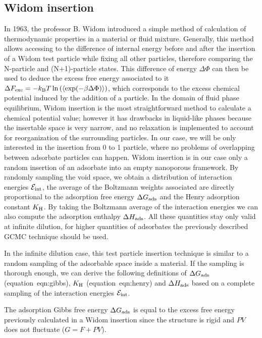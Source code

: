 \documentclass[main.tex]{subfiles}
\begin{document}
\subsection{Widom insertion}

In 1963, the professor B. Widom introduced a simple method of calculation of thermodynamic properties in a material or fluid mixture.\cite{Widom1963} Generally, this method allows accessing to the difference of internal energy before and after the insertion of a Widom test particle while fixing all other particles, therefore comparing the N-particle and (N+1)-particle states. This difference of energy $\Delta \Phi$ can then be used to deduce the excess free energy associated to it $\Delta F_{\text{exc}} = -k_{\text{B}} T \ln\left(\langle \exp(- \beta\Delta \Phi) \rangle\right)$, which corresponds to the excess chemical potential induced by the addition of a particle. In the domain of fluid phase equilibrium, Widom insertion is the most straightforward method to calculate a chemical potential value; however it has drawbacks in liquid-like phases because the insertable space is very narrow, and no relaxation is implemented to account for reorganization of the surrounding particles.\cite{Nezbeda_1991} In our case, we will be only interested in the insertion from 0 to 1 particle, where no problems of overlapping between adsorbate particles can happen. Widom insertion is in our case only a random insertion of an adsorbate into an empty nanoporous framework. By randomly sampling the void space, we obtain a distribution of interaction energies $\mathcal{E}_{\text{int}}$, the average of the Boltzmann weights associated are directly proportional to the adsorption free energy $\Delta G_{\text{ads}}$ and the Henry adsorption constant $K_{\text{H}}$. By taking the Boltzmann average of the interaction energies we can also compute the adsorption enthalpy $\Delta H_{\text{ads}}$. All these quantities stay only valid at infinite dilution, for higher quantities of adsorbates the previously described GCMC technique should be used.  

In the infinite dilution case, this test particle insertion technique is similar to a random sampling of the adsorbable space inside a material. If the sampling is thorough enough, we can derive the following definitions of $\Delta G_{\text{ads}}$ (equation~{eqn:gibbs}), $K_{\text{H}}$ (equation~{eqn:henry}) and $\Delta H_{\text{ads}}$ based on a complete sampling of the interaction energies $\mathcal{E}_{\text{int}}$. 

The adsorption Gibbs free energy $\Delta G_{\text{ads}}$ is equal to the excess free energy previously calculated in a Widom insertion since the structure is rigid and $PV$ does not fluctuate ($G = F + PV$). 
\end{document}
